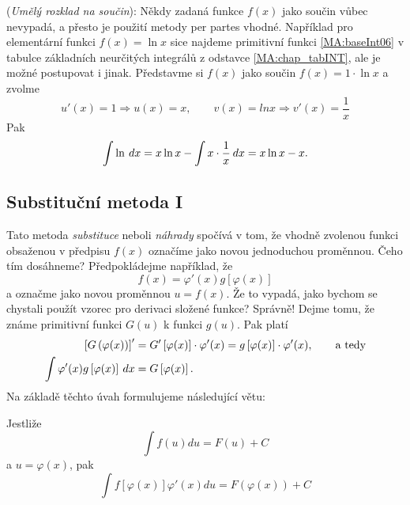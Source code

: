       \begin{example}
        (\emph{Umělý rozklad na součin}): Někdy zadaná funkce \(f(x)\) jako součin vůbec nevypadá, a přesto 
        je použití metody per partes vhodné. Například pro elementární funkci \(f(x) = \ln x\) sice najdeme 
        primitivní funkci \ref{MA:baseInt06} v tabulce základních neurčitých integrálů z odstavce 
        \ref{MA:chap_tabINT}, ale je možné postupovat i jinak. Představme si \(f(x)\) jako součin 
        \(f(x) = 1\cdot\ln x\) a zvolme \[u'(x) = 1 ⇒ u(x) = x, \qquad v(x) = lnx ⇒ v'(x) = \frac{1}{x}\] 
        Pak \[\int \ln\hspace{2pt}dx = x\ln x - \int x\cdot\frac{1}{x}\hspace{2pt}dx = x\ln x - x.\]
      \end{example}
  
    \subsection{Substituční metoda I}
      Tato metoda \emph{substituce} neboli \emph{náhrady} spočívá v tom, že vhodně zvolenou funkci 
      obsaženou v předpisu \(f(x)\) označíme jako novou jednoduchou proměnnou. Čeho tím dosáhneme? 
      Předpokládejme například, že \[f(x)=\varphi'(x)g[\varphi(x)]\] a označme jako novou proměnnou \(u = 
      f(x)\). Že to vypadá, jako bychom se chystali použít vzorec pro derivaci složené funkce? Správně! 
      Dejme tomu, že známe primitivní funkci \(G(u)\) k funkci \(g(u)\). Pak platí
      \begin{align*}
       \left[G\left(\varphi(x)\right)\right]' 
          &= G'\left[\varphi(x)\right]\cdot\varphi'(x) =
             g\left[\varphi(x)\right]\cdot\varphi'(x), \qquad\text{a tedy}   \\
       \int \varphi'(x) g\left[\varphi(x)\right]\hspace{2pt}dx &=  G\left[\varphi(x)\right]. 
      \end{align*}      
      Na základě těchto úvah formulujeme následující větu:
      \begin{lemma}
        Jestliže
        \begin{equation}\label{ma:eq_subst1}
          \int{f(u)du}=F(u)+C
        \end{equation}
        a $u=\varphi(x)$, pak
        \begin{equation}\label{ma:eq_subst2}
            \int{f[\varphi(x)]\varphi'(x)du}=F(\varphi(x))+C
        \end{equation}
      \end{lemma}
  
